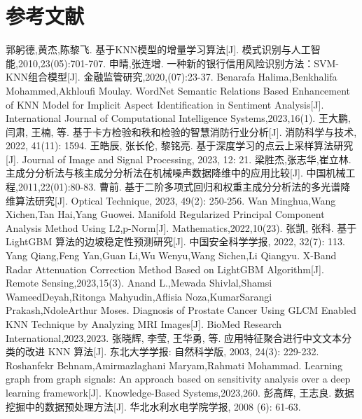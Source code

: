 \section{参考文献}


\renewcommand{\refname}{}
\vspace{-3em}  


\begin{thebibliography}{200}  
	郭躬德,黄杰,陈黎飞. 基于KNN模型的增量学习算法[J]. 模式识别与人工智能,2010,23(05):701-707.
	申晴,张连增. 一种新的银行信用风险识别方法：SVM-KNN组合模型[J]. 金融监管研究,2020,(07):23-37.
	Benarafa Halima,Benkhalifa Mohammed,Akhloufi Moulay. WordNet Semantic Relations Based Enhancement of KNN Model for Implicit Aspect Identification in Sentiment Analysis[J]. International Journal of Computational Intelligence Systems,2023,16(1).
	王大鹏, 闫肃, 王楠, 等. 基于卡方检验和秩和检验的智慧消防行业分析[J]. 消防科学与技术, 2022, 41(11): 1594.
	王皓辰, 张长伦, 黎铭亮. 基于深度学习的点云上采样算法研究[J]. Journal of Image and Signal Processing, 2023, 12: 21.
	梁胜杰,张志华,崔立林. 主成分分析法与核主成分分析法在机械噪声数据降维中的应用比较[J]. 中国机械工程,2011,22(01):80-83.
	曹前. 基于二阶多项式回归和权重主成分分析法的多光谱降维算法研究[J]. Optical Technique, 2023, 49(2): 250-256.
	Wan Minghua,Wang Xichen,Tan Hai,Yang Guowei. Manifold Regularized Principal Component Analysis Method Using L2,p-Norm[J]. Mathematics,2022,10(23).
    张凯, 张科. 基于 LightGBM 算法的边坡稳定性预测研究[J]. 中国安全科学学报, 2022, 32(7): 113.
    Yang Qiang,Feng Yan,Guan Li,Wu Wenyu,Wang Sichen,Li Qiangyu. X-Band Radar Attenuation Correction Method Based on LightGBM Algorithm[J]. Remote Sensing,2023,15(3).
    Anand L.,Mewada Shivlal,Shamsi WameedDeyah,Ritonga Mahyudin,Aflisia Noza,KumarSarangi Prakash,NdoleArthur Moses. Diagnosis of Prostate Cancer Using GLCM Enabled KNN Technique by Analyzing MRI Images[J]. BioMed Research International,2023,2023.
    张晓辉, 李莹, 王华勇, 等. 应用特征聚合进行中文文本分类的改进 KNN 算法[J]. 东北大学学报: 自然科学版, 2003, 24(3): 229-232.
    Roshanfekr Behnam,Amirmazlaghani Maryam,Rahmati Mohammad. Learning graph from graph signals: An approach based on sensitivity analysis over a deep learning framework[J]. Knowledge-Based Systems,2023,260.
    彭高辉, 王志良. 数据挖掘中的数据预处理方法[J]. 华北水利水电学院学报, 2008 (6): 61-63.

\end{thebibliography}
